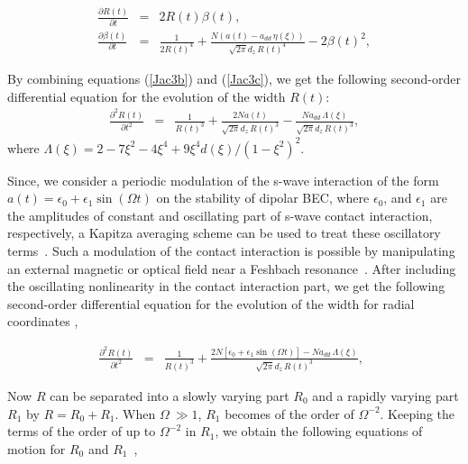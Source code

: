 \documentclass[amsmath,amssymb,article,twocolumn,superscriptaddress,showpacs,10pt]{revtex4-1}
\begin{document}
\begin{eqnarray} 
\frac{\partial R(t)}{\partial t} & = &2R(t)\beta(t),\label{Jac3b}\\
\frac{\partial \beta(t)}{\partial t}& = &\frac {1}{2R(t)^4}+\frac{N(a(t)-a_{dd}\,\eta(\xi))}{\sqrt{2\pi} d_z \, R(t)^4}-2\beta(t)^2, \label{Jac3c}
\end{eqnarray}

By combining equations (\ref{Jac3b}) and (\ref{Jac3c}), we get the following
second-order differential equation for the evolution of the
width $R(t)$:
\begin{eqnarray}
 \frac{\partial^2 R(t)}{\partial t^2} & = & \frac {1}{R(t)^3}+\frac{2 Na(t)}{\sqrt{2\pi} d_z \, R(t)^3}-\frac{Na_{dd}\,\Lambda(\xi)}{\sqrt{2\pi} d_z \, R(t)^3}, \label{Jac4} \end{eqnarray}
where $\Lambda(\xi)=2-7\xi^2-4\xi^4+9\xi^4 d(\xi)/(1-\xi^2)^2$.
 
Since, we consider a periodic modulation of the s-wave interaction of the form $a(t) = \epsilon_0 + \epsilon_1 \sin{(\Omega t)}$ on the stability of dipolar BEC, where $\epsilon_0$, and $\epsilon_1 $ are the amplitudes of constant and oscillating part of s-wave contact interaction, respectively, a Kapitza averaging scheme can be used to treat these oscillatory terms~\cite{Landau:1960}. Such a modulation of the contact interaction is possible by manipulating an external magnetic or optical field near a Feshbach resonance~\cite{Kivshar:1971,Zeng:2012,Adhikari:2004,Dai:2011,Sabari:2010,Saito:2003,
Wu:2010,Wang:2010}. After including the oscillating nonlinearity in the contact interaction part, we get the following second-order differential equation for the evolution of the width for radial coordinates \cite{Muruganandam:2012},

\begin{eqnarray}
\frac{\partial^2 R(t)}{\partial t^2} & = & \frac {1}{R(t)^3}+ \frac{2N [\epsilon_0+\epsilon_1\sin(\Omega t)]-Na_{dd}\,\Lambda(\xi)}{\sqrt{2\pi} d_z \, R(t)^3}, \,\,\, \label{Jac6}
\end{eqnarray}

Now $R$ can be separated into a slowly varying part $R_0$ and a rapidly varying part $R_1$ by $R=R_0+R_1$. When $ \Omega\ \gg 1 $, $R_1$ becomes of the order of $\Omega^{-2}$. Keeping the terms of the order of up to $\Omega^{-2}$ in $R_1$, we obtain the following equations of motion for $R_0$ and $R_1$~\cite{Landau:1960},
\end{document}
